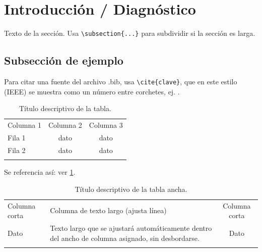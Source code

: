 \documentclass[fleqn, final]{jaes}
\begin{document}
\section{Introducción / Diagnóstico}\label{sec:introduccion}

Texto de la sección. Usa \verb|\subsection{...}| para subdividir si
la sección es larga.

\subsection{Subsección de ejemplo}

Para citar una fuente del archivo .bib, usa \verb|\cite{clave}|, que en
este estilo (IEEE) se muestra como un número entre corchetes, ej.
\cite{ejemplo_clave}.

\begin{table}[tb]
\centering
\caption{Título descriptivo de la tabla.}
\label{table:ejemplo}
{%
\begin{tabular}{@{}lcc@{}}\toprule
Columna 1 & Columna 2 & Columna 3\\\colrule
Fila 1 & dato & dato\\
Fila 2 & dato & dato\\\botrule
\end{tabular}}
\end{table}

Se referencia así: ver \cref{table:ejemplo}.

\begin{table}[tb]
\centering
\caption{Título descriptivo de la tabla ancha.}
\label{table:ejemplo_ancho}
{\small
\begin{tabularx}{\textwidth}{@{}lYc@{}}\toprule
Columna corta & Columna de texto largo (ajusta línea) & Columna corta\\\colrule
Dato & Texto largo que se ajustará automáticamente dentro del ancho de columna asignado, sin desbordarse. & Dato\\\botrule
\end{tabularx}}
\end{table}
\end{document}

